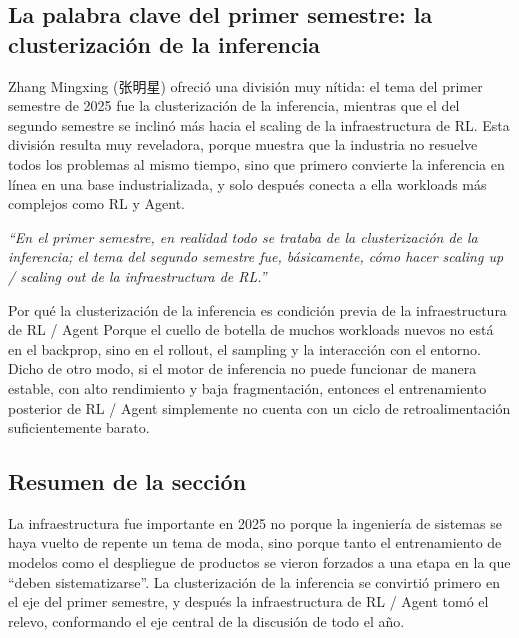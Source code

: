 \subsection{La palabra clave del primer semestre: la clusterización de la inferencia}
Zhang Mingxing (张明星) ofreció una división muy nítida: el tema del primer semestre de 2025 fue la clusterización de la inferencia, mientras que el del segundo semestre se inclinó más hacia el scaling de la infraestructura de RL. Esta división resulta muy reveladora, porque muestra que la industria no resuelve todos los problemas al mismo tiempo, sino que primero convierte la inferencia en línea en una base industrializada, y solo después conecta a ella workloads más complejos como RL y Agent.

\textit{``En el primer semestre, en realidad todo se trataba de la clusterización de la inferencia; el tema del segundo semestre fue, básicamente, cómo hacer scaling up / scaling out de la infraestructura de RL.''}

\begin{knowledgebox}{Por qué la clusterización de la inferencia es condición previa de la infraestructura de RL / Agent}
Porque el cuello de botella de muchos workloads nuevos no está en el backprop, sino en el rollout, el sampling y la interacción con el entorno. Dicho de otro modo, si el motor de inferencia no puede funcionar de manera estable, con alto rendimiento y baja fragmentación, entonces el entrenamiento posterior de RL / Agent simplemente no cuenta con un ciclo de retroalimentación suficientemente barato.
\end{knowledgebox}

\subsection{Resumen de la sección}
La infraestructura fue importante en 2025 no porque la ingeniería de sistemas se haya vuelto de repente un tema de moda, sino porque tanto el entrenamiento de modelos como el despliegue de productos se vieron forzados a una etapa en la que ``deben sistematizarse''. La clusterización de la inferencia se convirtió primero en el eje del primer semestre, y después la infraestructura de RL / Agent tomó el relevo, conformando el eje central de la discusión de todo el año.
